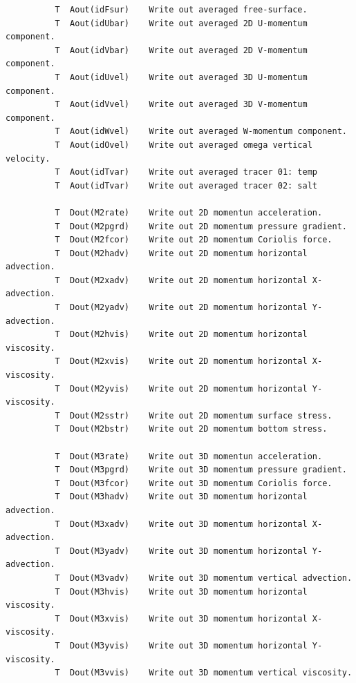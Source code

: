 \begin{verbatim}
          T  Aout(idFsur)    Write out averaged free-surface.
          T  Aout(idUbar)    Write out averaged 2D U-momentum component.
          T  Aout(idVbar)    Write out averaged 2D V-momentum component.
          T  Aout(idUvel)    Write out averaged 3D U-momentum component.
          T  Aout(idVvel)    Write out averaged 3D V-momentum component.
          T  Aout(idWvel)    Write out averaged W-momentum component.
          T  Aout(idOvel)    Write out averaged omega vertical velocity.
          T  Aout(idTvar)    Write out averaged tracer 01: temp
          T  Aout(idTvar)    Write out averaged tracer 02: salt

          T  Dout(M2rate)    Write out 2D momentun acceleration.
          T  Dout(M2pgrd)    Write out 2D momentum pressure gradient.
          T  Dout(M2fcor)    Write out 2D momentum Coriolis force.
          T  Dout(M2hadv)    Write out 2D momentum horizontal advection.
          T  Dout(M2xadv)    Write out 2D momentum horizontal X-advection.
          T  Dout(M2yadv)    Write out 2D momentum horizontal Y-advection.
          T  Dout(M2hvis)    Write out 2D momentum horizontal viscosity.
          T  Dout(M2xvis)    Write out 2D momentum horizontal X-viscosity.
          T  Dout(M2yvis)    Write out 2D momentum horizontal Y-viscosity.
          T  Dout(M2sstr)    Write out 2D momentum surface stress.
          T  Dout(M2bstr)    Write out 2D momentum bottom stress.

          T  Dout(M3rate)    Write out 3D momentun acceleration.
          T  Dout(M3pgrd)    Write out 3D momentum pressure gradient.
          T  Dout(M3fcor)    Write out 3D momentum Coriolis force.
          T  Dout(M3hadv)    Write out 3D momentum horizontal advection.
          T  Dout(M3xadv)    Write out 3D momentum horizontal X-advection.
          T  Dout(M3yadv)    Write out 3D momentum horizontal Y-advection.
          T  Dout(M3vadv)    Write out 3D momentum vertical advection.
          T  Dout(M3hvis)    Write out 3D momentum horizontal viscosity.
          T  Dout(M3xvis)    Write out 3D momentum horizontal X-viscosity.
          T  Dout(M3yvis)    Write out 3D momentum horizontal Y-viscosity.
          T  Dout(M3vvis)    Write out 3D momentum vertical viscosity.


\end{verbatim}
